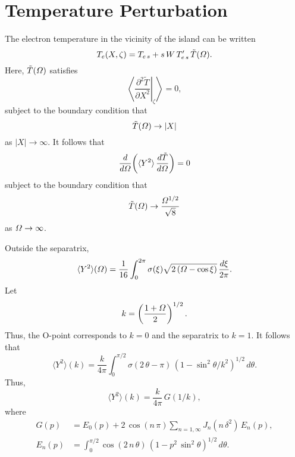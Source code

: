 \documentclass[12pt,prb,aps,notitlepage]{revtex4-1}
\begin{document}
\section{Temperature Perturbation}
The electron temperature in the vicinity of the island can be written
\begin{equation}
T_e(X,\zeta) = T_{e\,s} + s\,W\,T_{e\,s}'\,\tilde{T}({\mit\Omega}).
\end{equation}
Here, $\tilde{T}({\mit\Omega})$ satisfies
\begin{equation}\label{e30}
\left\langle \left.\frac{\partial ^2\tilde{T}}{\partial X^2}\right|_\zeta \right\rangle =0,
\end{equation}
subject to the boundary condition that
\begin{equation}
\tilde{T}({\mit\Omega})\rightarrow |X|
\end{equation}
as $|X|\rightarrow \infty$. It
follows that
\begin{equation}\label{e34}
\frac{d}{d{\mit\Omega}}\!\left(\langle Y^2\rangle\,\frac{d\tilde{T}}{d{\mit\Omega}}\right)=0
\end{equation}
subject to the boundary condition that
\begin{equation}
\tilde{T}({\mit\Omega})\rightarrow \frac{{\mit\Omega}^{1/2}}{\sqrt{8}}
\end{equation}
as ${\mit\Omega}\rightarrow\infty$. 

Outside the separatrix,
\begin{equation}
\langle Y^2\rangle({\mit\Omega}) = \frac{1}{16}\int_0^{2\pi}\sigma(\xi)\sqrt{2\,({\mit\Omega}-\cos\xi)}\,\frac{d\xi}{2\pi}.
\end{equation}
Let 
\begin{equation}
k = \left(\frac{1+{\mit\Omega}}{2}\right)^{1/2}.
\end{equation}
Thus, the O-point corresponds to $k=0$ and the separatrix to $k=1$. 
It follows that 
\begin{equation}
\langle Y^2\rangle(k) = \frac{k}{4\pi}\int_0^{\pi/2}\sigma(2\,\theta-\pi)\,(1-\sin^2\theta/k^2)^{1/2}\,d\theta.
\end{equation}
Thus,
\begin{equation}
\langle Y^2\rangle(k) = \frac{k}{4\pi}\,G(1/k),
\end{equation}
where
\begin{align}
G(p) &=E_0(p) +2\,\cos(n\,\pi)\sum_{n=1,\infty}J_n(n\,\delta^2)\,E_n(p),\\[0.5ex]
E_n(p) &= \int_0^{\pi/2} \cos(2\,n\,\theta)\,(1-p^2\,\sin^2\theta)^{1/2}\,d\theta.
\end{align}
\end{document}
